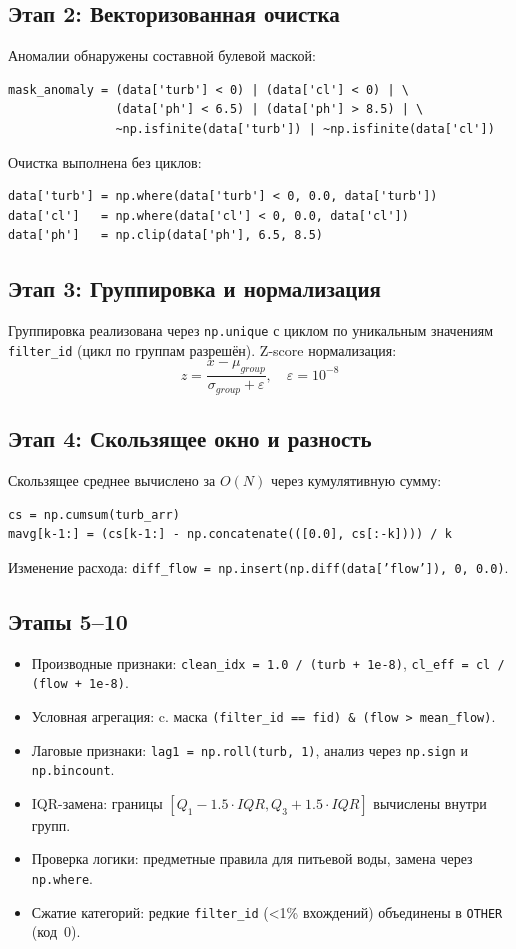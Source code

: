 \documentclass[oneside,a4paper,14pt]{extarticle}
\begin{document}
\subsection*{Этап 2: Векторизованная очистка}
Аномалии обнаружены составной булевой маской:
\begin{lstlisting}
mask_anomaly = (data['turb'] < 0) | (data['cl'] < 0) | \
			   (data['ph'] < 6.5) | (data['ph'] > 8.5) | \
			   ~np.isfinite(data['turb']) | ~np.isfinite(data['cl'])
\end{lstlisting}
Очистка выполнена без циклов:
\begin{lstlisting}
data['turb'] = np.where(data['turb'] < 0, 0.0, data['turb'])
data['cl']   = np.where(data['cl'] < 0, 0.0, data['cl'])
data['ph']   = np.clip(data['ph'], 6.5, 8.5)
\end{lstlisting}

\subsection*{Этап 3: Группировка и нормализация}
Группировка реализована через \texttt{np.unique} с циклом по уникальным значениям \texttt{filter\_id} (цикл по группам разрешён). Z-score нормализация:
\begin{equation}
z = \frac{x - \mu_{group}}{\sigma_{group} + \varepsilon}, \quad \varepsilon = 10^{-8}
\end{equation}

\subsection*{Этап 4: Скользящее окно и разность}
Скользящее среднее вычислено за $O(N)$ через кумулятивную сумму:
\begin{lstlisting}
cs = np.cumsum(turb_arr)
mavg[k-1:] = (cs[k-1:] - np.concatenate(([0.0], cs[:-k]))) / k
\end{lstlisting}
Изменение расхода: \texttt{diff\_flow = np.insert(np.diff(data['flow']), 0, 0.0)}.

\subsection*{Этапы 5--10}
\begin{itemize}
	\item Производные признаки: \texttt{clean\_idx = 1.0 / (turb + 1e-8)}, \texttt{cl\_eff = cl / (flow + 1e-8)}.
	\item Условная агрегация: c. маска \texttt{(filter\_id == fid) \& (flow > mean\_flow)}.
	\item Лаговые признаки: \texttt{lag1 = np.roll(turb, 1)}, анализ через \texttt{np.sign} и \texttt{np.bincount}.
	\item IQR-замена: границы $[Q_1 - 1.5\cdot IQR, Q_3 + 1.5\cdot IQR]$ вычислены внутри групп.
	\item Проверка логики: предметные правила для питьевой воды, замена через \texttt{np.where}.
	\item Сжатие категорий: редкие \texttt{filter\_id} (<1\% вхождений) объединены в \texttt{OTHER} (код~0).
\end{itemize}
\end{document}
